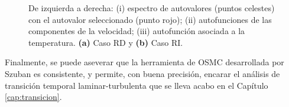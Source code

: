 \begin{figure}[H]
 \centering 
      
 \caption{De izquierda a derecha: (i) espectro de autovalores (puntos celestes) con el autovalor seleccionado (punto rojo); (ii) autofunciones de las componentes de la velocidad; (iii) autofunción asociada a la temperatura. \textbf{(a)} Caso RD y \textbf{(b)} Caso RI.} 
 \label{fig:Ra65-2d}
\end{figure}

Finalmente, se puede aseverar que la herramienta de OSMC desarrollada por Szuban \cite{szuban2023} es consistente, y permite, con buena precisión, encarar el análisis de transición temporal laminar-turbulenta que se lleva acabo en el Capítulo \ref{cap:transicion}.   